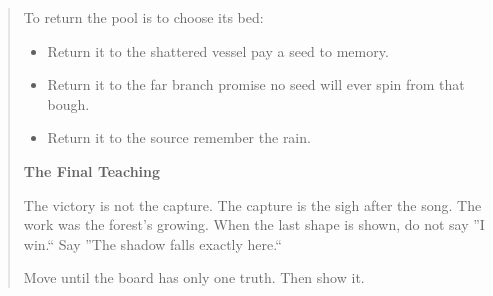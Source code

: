 \documentclass[11pt]{article}
\begin{document}
\begin{quote}
To return the pool is to choose its bed:
\begin{itemize}\itemsep0.2em
  \item Return it to the shattered vessel\; pay a seed to memory.
  \item Return it to the far branch\; promise no seed will ever spin from that bough.
  \item Return it to the source\; remember the rain.
\end{itemize}

\medskip
\textbf{The Final Teaching}

The victory is not the capture. The capture is the sigh after the song. The work was the forest's growing. When the last shape is shown, do not say ''I win.`` Say\; ''The shadow falls exactly here.``

Move until the board has only one truth. Then show it.
\end{quote}

\clearpage
\end{document}

